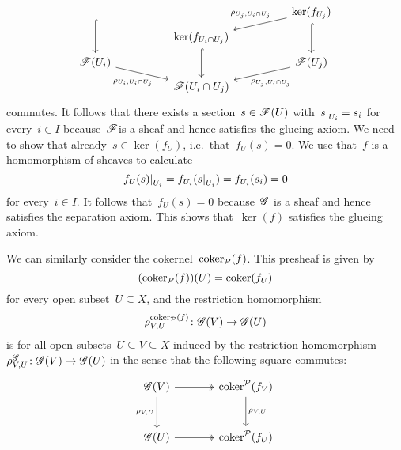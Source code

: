 \begin{example}
\begin{enumerate}
\begin{enumerate}[label=(S\arabic*)]
\[\begin{tikzcd}[column sep = huge, row sep = tiny]
                \arrow[hook]{dd}
              & {}
              & \ker(f_{U_j})
                \arrow{dl}[above left, near start]{\rho_{U_j, U_i \cap U_j}}
                \arrow[hook]{dd}
              \\
                {}
              & \ker(f_{U_i \cap U_j})
                \arrow[hook]{dd}
              & {}
              \\
                \sheaf{F}(U_i)
                \arrow{dr}[below left, near end]{\rho_{U_i, U_i \cap U_j}}
              & {}
              & \sheaf{F}(U_j)
                \arrow{dl}[below right, near end]{\rho_{U_j, U_i \cap U_j}}
              \\
                {}
              & \sheaf{F}(U_i \cap U_j)
              & {}
            \end{tikzcd}
          \]
          commutes.
          It follows that there exists a section~$s \in \mathscr{F}(U)$ with~$\restrict{s}{U_i} = s_i$ for every~$i \in I$ because~$\mathscr{F}$is a sheaf and hence satisfies the glueing axiom.
          We need to show that already~$s \in \ker(f_U)$, i.e.\ that~$f_U(s) = 0$.
          We use that~$f$ is a homomorphism of sheaves to calculate
          \[
              \restrict{f_U(s)}{U_i}
            = f_{U_i}( \restrict{s}{U_i} )
            = f_{U_i}(s_i)
            = 0
          \]
          for every~$i \in I$.
          It follows that~$f_U(s) = 0$ because~$\mathscr{G}$ is a sheaf and hence satisfies the separation axiom.
          This shows that~$\ker(f)$ satisfies the glueing axiom.
      \end{enumerate}
      
      We can similarly consider the cokernel~$\operatorname{coker}_{\mathcal{P}}(f)$.
      This presheaf is given by
      \[
        (\operatorname{coker}_{\mathcal{P}}(f))(U) = \operatorname{coker}(f_U)
      \]
      for every open subset~$U \subseteq X$, and the restriction homomorphism
      \[
                \rho^{\operatorname{coker}_{\mathcal{P}}(f)}_{V,U}
        \colon  \mathscr{G}(V)
        \to     \mathscr{G}(U)
      \]
      is for all open subsets~$U \subseteq V \subseteq X$ induced by the restriction homomorphism~$\rho^{\mathscr{G}}_{V,U} \colon \mathscr{G}(V) \to \mathscr{G}(U)$ in the sense that the following square commutes:
      \[
        \begin{tikzcd}[sep = large]
            \sheaf{G}(V)
            \arrow[two heads]{r}
            \arrow{d}[left]{\rho_{V,U}}
          & \coker^{\Pcat}(f_V)
            \arrow{d}[right]{\rho_{V,U}}
          \\
            \sheaf{G}(U)
            \arrow[two heads]{r}
          & \coker^{\Pcat}(f_U)
        \end{tikzcd}
      \]
      

\end{enumerate}
\end{example}
